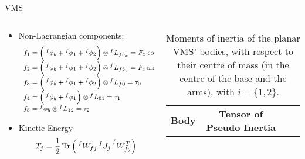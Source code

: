 \begin{frame}{VMS}
\begin{columns}
    \begin{column}{0.5\textwidth}
        \begin{itemize}
            \item Non-Lagrangian components:
            \begin{equation}
                \begin{footnotesize}
                \begin{array}{l}
                f_1=\Big(\prescript{f}{}{\phi_b}+\prescript{f}{}{\phi_1}+\prescript{f}{}{\phi_2}\Big)\otimes \prescript{f}{}{L_{fb_x}}=F_x\cos{\theta_0}-F_y\sin{\theta_0}\\
                f_2=\Big(\prescript{f}{}{\phi_b}+\prescript{f}{}{\phi_1}+\prescript{f}{}{\phi_2}\Big)\otimes \prescript{f}{}{L_{fb_y}}=F_x\sin{\theta_0}+F_y\cos{\theta_0}\\
                f_3=\Big(\prescript{f}{}{\phi_b}+\prescript{f}{}{\phi_1}+\prescript{f}{}{\phi_2}\Big)\otimes \prescript{f}{}{L_{f0}}=\tau_0\\
                f_4=\Big(\prescript{f}{}{\phi_b}+\prescript{f}{}{\phi_1}\Big)\otimes \prescript{f}{}{L_{01}}=\tau_1\\
                f_5=\prescript{f}{}{\phi_b}\otimes \prescript{f}{}{L_{12}}=\tau_2
                \end{array}
            \end{footnotesize}
              \end{equation}
            \item Kinetic Energy
            \begin{equation}
                  T_j=\frac{1}{2}\operatorname{Tr}{\Big(\prescript{f}{}{W_{fj}}\prescript{f}{}{J_j}\prescript{f}{}{W_{fj}^T}\Big)}
              \end{equation} 
        \end{itemize}
    \end{column}
    \begin{column}{0.5\textwidth}
        \begin{table}
            \caption{Moments of inertia of the planar VMS' bodies, with respect to their centre of mass (in the centre of the base and the arms), with $i=\{1,2\}$.}
            \begin{center}
            \begin{tabular}{lccc}
            \hline
            \textbf{Body} & \textbf{Tensor of Pseudo Inertia}\\

\end{tabular}
\end{center}
\end{table}
\end{column}
\end{columns}
\end{frame}
